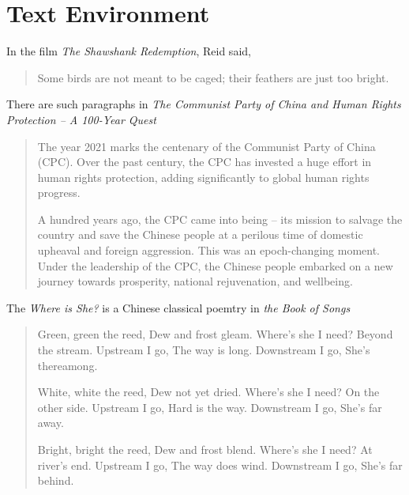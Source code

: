 \documentclass{article}
\begin{document}
    \section{Text Environment}
        In the film \textit{The Shawshank Redemption}, Reid said, 
        \begin{quote}           %
            Some birds are not meant to be caged; their feathers are just too bright. 
        \end{quote}
        There are such paragraphs in \textit{The Communist Party of China and Human Rights Protection -- A 100-Year Quest}
        \begin{quotation}       %
            The year 2021 marks the centenary of the Communist Party of China (CPC). 
            Over the past century, the CPC has invested a huge effort in human rights 
            protection, adding significantly to global human rights progress.

            A hundred years ago, the CPC came into being – its mission to salvage the 
            country and save the Chinese people at a perilous time of domestic upheaval 
            and foreign aggression. This was an epoch-changing moment. Under the leadership 
            of the CPC, the Chinese people embarked on a new journey towards prosperity, 
            national rejuvenation, and wellbeing.
        \end{quotation}
        The \textit{Where is She?} is a Chinese classical poemtry in \textit{the Book of Songs}
        \begin{verse}
            Green, green the reed,
            Dew and frost gleam.
            Where’s she I need?
            Beyond the stream.
            Upstream I go,
            The way is long.
            Downstream I go,
            She’s thereamong.
            
            White, white the reed,
            Dew not yet dried.
            Where’s she I need?
            On the other side.
            Upstream I go,
            Hard is the way.
            Downstream I go,
            She’s far away.
            
            Bright, bright the reed,
            Dew and frost blend.
            Where’s she I need?
            At river’s end.
            Upstream I go,
            The way does wind.
            Downstream I go,
            She’s far behind.
        \end{verse}
    
\end{document}
